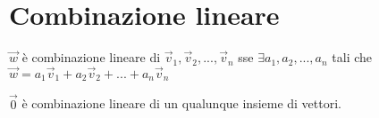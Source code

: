 \section{Combinazione lineare}
$\vec{w}$ è combinazione lineare di $\vec{v}_1, \vec{v}_2, ..., \vec{v}_n$ sse $\exists a_1, a_2, ..., a_n$
tali che $\vec{w} = a_1\vec{v}_1 + a_2\vec{v}_2 + ... + a_n\vec{v}_n$

$\vec{0}$ è combinazione lineare di un qualunque insieme di vettori.
